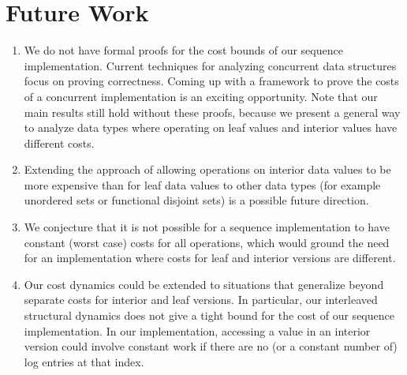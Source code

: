 \section{Future Work}
\label{sec:conclusion}
\begin{enumerate}
\item We do not have formal proofs for the cost bounds of our sequence implementation. Current techniques for analyzing concurrent data structures focus on proving correctness. Coming up with a framework to prove the costs of a concurrent implementation is an exciting opportunity. Note that our main results still hold without these proofs, because we present a general way to analyze data types where operating on leaf values and interior values have different costs.

\item Extending the approach of allowing operations on interior data values to be more expensive than for leaf data values to other data types (for example unordered sets or functional disjoint sets) is a possible future direction.

\item We conjecture that it is not possible for a sequence implementation to have constant (worst case) costs for all operations, which would ground the need for an implementation where costs for leaf and interior versions are different.

\item Our cost dynamics could be extended to situations that generalize beyond separate costs for interior and leaf versions. In particular, our interleaved structural dynamics does not give a tight bound for the cost of our sequence implementation. In our implementation, accessing a value in an interior version could involve constant work if there are no (or a constant number of) log entries at that index.

\end{enumerate}